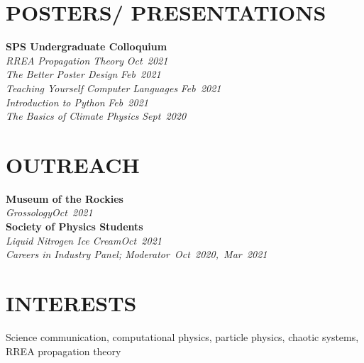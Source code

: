 \documentclass[margin]{res}
\begin{document}
\begin{resume}
\section{POSTERS/ PRESENTATIONS}
\raggedright
\textbf{SPS Undergraduate Colloquium}\\
\hspace{3ex} {\sl RREA Propagation Theory} \hfill {\sl Oct~2021}\\\vspace{0.5ex}
\hspace{3ex} {\sl The Better Poster Design} \hfill {\sl Feb~2021}\\\vspace{0.5ex}
\hspace{3ex} {\sl Teaching Yourself Computer Languages} \hfill {\sl Feb~2021}\\\vspace{0.5ex}
\hspace{3ex} {\sl Introduction to Python} \hfill {\sl Feb~2021}\\\vspace{0.5ex}
\hspace{3ex} {\sl The Basics of Climate Physics} \hfill {\sl Sept~2020}\\

	
\section{OUTREACH}
\raggedright
\textbf{Museum of the Rockies}\\
\hspace{3ex} {\sl Grossology}\hfill {\sl Oct~2021}\\\vspace{0.5ex}
\textbf{Society of Physics Students}\\
\hspace{3ex} {\sl Liquid Nitrogen Ice Cream}\hfill {\sl Oct~2021}\\\vspace{0.5ex}
\hspace{3ex} {\sl Careers in Industry Panel; Moderator}\hfill {\sl ~Oct~2020,~Mar~2021}\\


\section{INTERESTS}
Science communication, computational physics, particle physics, chaotic systems, RREA propagation theory

\end{resume}
\end{document}
